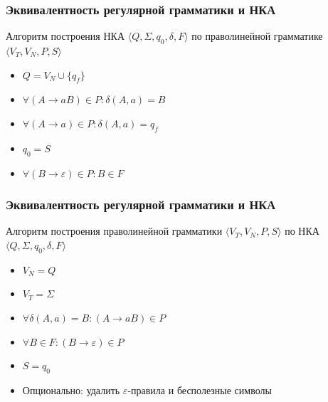 \documentclass{beamer}
\newenvironment{myauto}[1][3]
{
  \begin{center}
    \begin{tikzpicture}[> = stealth,node distance=#1cm, on grid, very thick]
}
{
    \end{tikzpicture}
  \end{center}
}
\begin{document}
\begin{frame}[fragile]
  \transwipe[direction=90]
  \frametitle{Эквивалентность регулярной грамматики и НКА}
  Алгоритм построения НКА $\langle Q, \Sigma, q_0, \delta, F \rangle$ по праволинейной грамматике $\langle V_T, V_N, P, S \rangle$

  \begin{itemize}
    \item $Q = V_N \cup \{q_f\}$
    \item $\forall (A \to a B) \in P: \delta (A, a) = B$
    \item $\forall (A \to a) \in P: \delta (A, a) = q_f$
    \item $q_0 = S$
    \item $\forall (B \to \varepsilon) \in P: B \in F$
  \end{itemize}
\end{frame}



\begin{frame}[fragile]
  \transwipe[direction=90]
  \frametitle{Эквивалентность регулярной грамматики и НКА}
  Алгоритм построения праволинейной грамматики $\langle V_T, V_N, P, S \rangle$ по НКА $\langle Q, \Sigma, q_0, \delta, F \rangle$

  \begin{itemize}
    \item $V_N = Q$
    \item $V_T = \Sigma$
    \item $\forall \delta(A, a) = B : (A \to a B) \in P$
    \item $\forall B \in F: (B \to \varepsilon) \in P$
    \item $S = q_0$
    \item Опционально: удалить $\varepsilon$-правила и бесполезные символы
  \end{itemize}
\end{frame}
\end{document}
